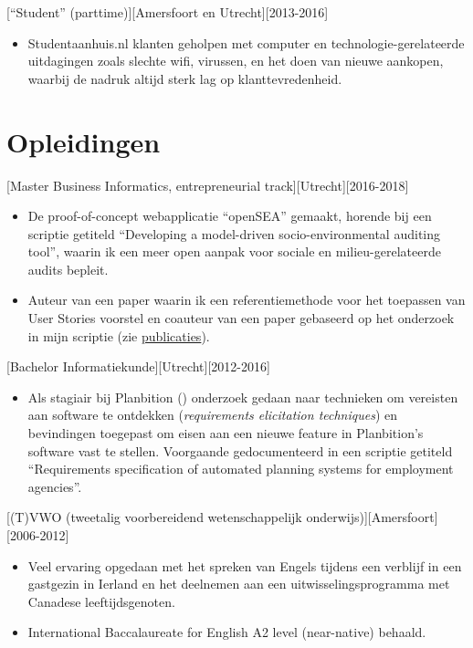 \documentclass[10pt]{article}
\begin{document}
[\enquote{Student} (parttime)][Amersfoort en
      Utrecht][2013-2016]
\begin{itemize}
      \item Studentaanhuis.nl klanten geholpen met computer en
            technologie-gerelateerde uitdagingen zoals slechte wifi, virussen, en het doen
            van nieuwe aankopen, waarbij de nadruk altijd sterk lag op klanttevredenheid.
\end{itemize}

\section{Opleidingen}
\label{sec:school}

[Master Business Informatics,
      entrepreneurial track][Utrecht][2016-2018]
\begin{itemize}
      \item De proof-of-concept webapplicatie \enquote{openSEA} gemaakt, horende bij
            een scriptie getiteld \enquote{Developing a model-driven socio-environmental
                  auditing tool}, waarin ik een meer open aanpak voor sociale en
            milieu-gerelateerde audits bepleit.
      \item Auteur van een paper waarin ik een referentiemethode voor het toepassen
            van User Stories voorstel en coauteur van een paper gebaseerd op het onderzoek
            in mijn scriptie (zie \hyperref[sec:pubs]{publicaties}).
\end{itemize}

[Bachelor
      Informatiekunde][Utrecht][2012-2016]
\begin{itemize}
      \item Als stagiair bij Planbition () onderzoek gedaan
            naar technieken om vereisten aan software te ontdekken (\textit{requirements
                  elicitation techniques}) en bevindingen toegepast om eisen aan een nieuwe
            feature in Planbition's software vast te stellen. Voorgaande gedocumenteerd in
            een scriptie getiteld \enquote{Requirements specification of automated planning
                  systems for employment agencies}.
\end{itemize}

[(T)VWO (tweetalig voorbereidend wetenschappelijk
      onderwijs)][Amersfoort][2006-2012]
\begin{itemize}
      \item Veel ervaring opgedaan met het spreken van Engels tijdens een verblijf in
            een gastgezin in Ierland en het deelnemen aan een uitwisselingsprogramma met
            Canadese leeftijdsgenoten.
      \item International Baccalaureate for English A2 level (near-native) behaald.
\end{itemize}
\end{document}
